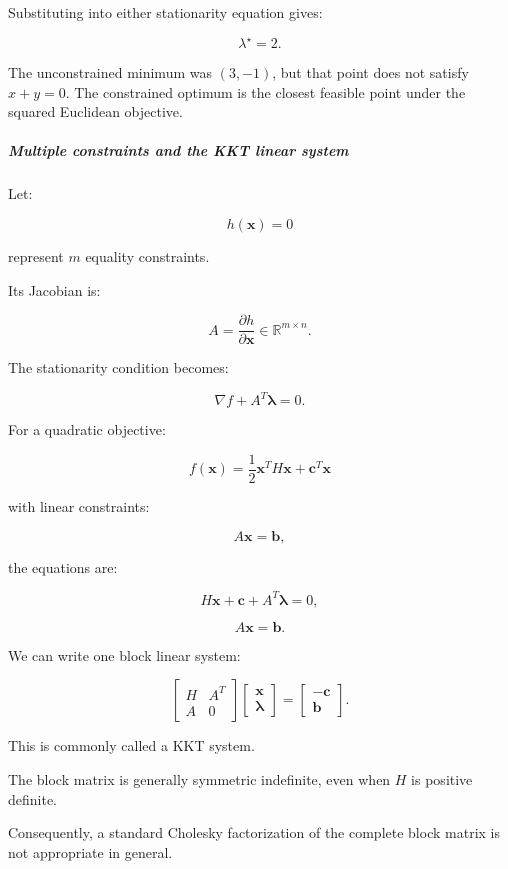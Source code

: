 Substituting into either stationarity equation gives:

\[
\boxed{\lambda^\star=2}.
\]

The unconstrained minimum was \((3,-1)\), but that point does not satisfy \(x+y=0\). The constrained optimum is the closest feasible point under the squared Euclidean objective.

\subparagraph{Multiple constraints and the KKT linear system}\label{multiple-constraints-and-the-kkt-linear-system}

Let:

\[
h(\mathbf x)=0
\]

represent \(m\) equality constraints.

Its Jacobian is:

\[
A=\frac{\partial h}{\partial\mathbf x} \in\mathbb R^{m\times n}.
\]

The stationarity condition becomes:

\[
\nabla f+A^T\boldsymbol\lambda=0.
\]

For a quadratic objective:

\[
f(\mathbf x)=\frac12\mathbf x^TH\mathbf x+\mathbf c^T\mathbf x
\]

with linear constraints:

\[
A\mathbf x=\mathbf b,
\]

the equations are:

\[
H\mathbf x+\mathbf c+A^T\boldsymbol\lambda=0,
\]

\[
A\mathbf x=\mathbf b.
\]

We can write one block linear system:

\[
\boxed{ \begin{bmatrix} H&A^T\\ A&0 \end{bmatrix} \begin{bmatrix} \mathbf x\\ \boldsymbol\lambda \end{bmatrix} = \begin{bmatrix} -\mathbf c\\ \mathbf b \end{bmatrix} }.
\]

This is commonly called a KKT system.

The block matrix is generally symmetric indefinite, even when \(H\) is positive definite.

Consequently, a standard Cholesky factorization of the complete block matrix is not appropriate in general.

